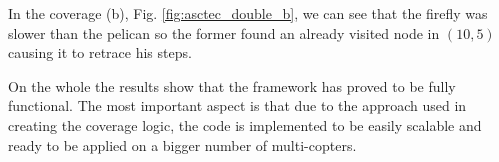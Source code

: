 

\noindent In the coverage (b), Fig. \ref{fig:asctec_double_b}, we can see that the firefly was slower than the pelican so the former found an already visited node in $(10,5)$ causing it to retrace his steps.

On the whole the results show that the framework has proved to be fully functional. The most important aspect is that due to the approach used in creating the coverage logic, the code is implemented to be easily scalable and ready to be applied on a bigger number of multi-copters.
